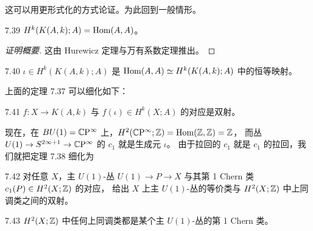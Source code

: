 这可以用更形式化的方式论证。为此回到一般情形。

\begin{proposition}{7.39}
$H^k(K(A,k);A)=\operatorname{Hom}(A,A)$。
\end{proposition}

\begin{proof}[证明概要]
这由 Hurewicz 定理与万有系数定理推出。
\end{proof}

\begin{definition}{7.40}
$\iota\in H^k(K(A,k);A)$ 是 $\operatorname{Hom}(A,A)\simeq H^k(K(A,k);A)$ 中的恒等映射。
\end{definition}

上面的定理 7.37 可以细化如下：

\begin{theorem}{7.41}
$f:X\to K(A,k)$ 与 $f(\iota)\in H^k(X;A)$ 的对应是双射。
\end{theorem}

现在，在 $BU(1)=\mathbb{C}\mathrm{P}^\infty$ 上，$H^2(\mathbb{C}\mathrm{P}^\infty;\mathbb{Z})=\operatorname{Hom}(\mathbb{Z},\mathbb{Z})=\mathbb{Z}$，
而丛 $U(1)\to S^{2\infty+1}\to\mathbb{C}\mathrm{P}^\infty$ 的 $c_1$ 就是生成元 $\iota$。
由于拉回的 $c_1$ 就是 $c_1$ 的拉回，我们就把定理 7.38 细化为

\begin{theorem}{7.42}
对任意 $X$，主 $U(1)$-丛 $U(1)\to P\to X$ 与其第 1 Chern 类 $c_1(P)\in H^2(X;\mathbb{Z})$ 的对应，
给出 $X$ 上主 $U(1)$-丛的等价类与 $H^2(X;\mathbb{Z})$ 中上同调类之间的双射。
\end{theorem}

\begin{corollary}{7.43}
$H^2(X;\mathbb{Z})$ 中任何上同调类都是某个主 $U(1)$-丛的第 1 Chern 类。
\end{corollary}


